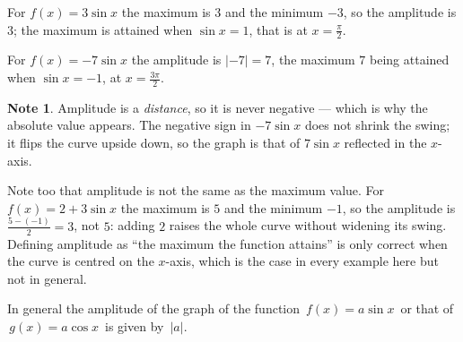 \documentclass[11pt,a4paper]{article}
\theoremstyle{definition}
\newtheorem{note}[thm]{Note}
\begin{document}
For $f(x)=3\sin x$ the maximum is $3$ and the minimum $-3$, so the amplitude is
$3$; the maximum is attained when $\sin x=1$, that is at $x=\frac{\pi}{2}$.

For $f(x)=-7\sin x$ the amplitude is $\left|-7\right|=7$, the maximum $7$ being
attained when $\sin x=-1$, at $x=\frac{3\pi}{2}$.

\begin{note}
Amplitude is a \emph{distance}, so it is never negative --- which is why the
absolute value appears. The negative sign in $-7\sin x$ does not shrink the swing;
it flips the curve upside down, so the graph is that of $7\sin x$ reflected in the
$x$-axis.

Note too that amplitude is not the same as the maximum value. For
$f(x)=2+3\sin x$ the maximum is $5$ and the minimum $-1$, so the amplitude is
$\frac{5-(-1)}{2}=3$, not $5$: adding $2$ raises the whole curve without widening
its swing. Defining amplitude as ``the maximum the function attains'' is only correct
when the curve is centred on the $x$-axis, which is the case in every example here
but not in general.
\end{note}





In general the amplitude of the graph of the function $\, f(x)   = a\sin x\,$ or that of\\ $\, g(x) = a \cos x\,$ is given by $\,\left|a\right|$.



\begin{figure}[H]
\centering
{}
\end{figure}
\end{document}
